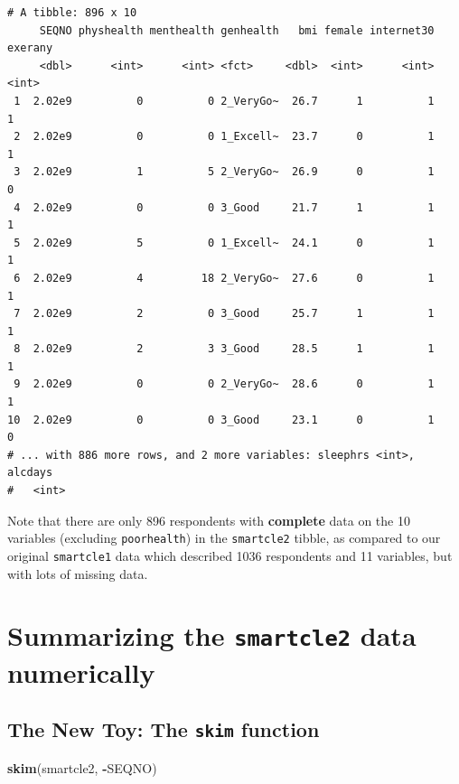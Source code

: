 \documentclass[]{book}
\newenvironment{Shaded}{\begin{snugshade}}{\end{snugshade}}
\newcommand{\KeywordTok}[1]{\textcolor[rgb]{0.13,0.29,0.53}{\textbf{#1}}}
\newcommand{\OperatorTok}[1]{\textcolor[rgb]{0.81,0.36,0.00}{\textbf{#1}}}
\newcommand{\NormalTok}[1]{#1}
\theoremstyle{definition}
\theoremstyle{definition}
\theoremstyle{definition}
\theoremstyle{remark}
\begin{document}
\begin{verbatim}
# A tibble: 896 x 10
     SEQNO physhealth menthealth genhealth   bmi female internet30 exerany
     <dbl>      <int>      <int> <fct>     <dbl>  <int>      <int>   <int>
 1  2.02e9          0          0 2_VeryGo~  26.7      1          1       1
 2  2.02e9          0          0 1_Excell~  23.7      0          1       1
 3  2.02e9          1          5 2_VeryGo~  26.9      0          1       0
 4  2.02e9          0          0 3_Good     21.7      1          1       1
 5  2.02e9          5          0 1_Excell~  24.1      0          1       1
 6  2.02e9          4         18 2_VeryGo~  27.6      0          1       1
 7  2.02e9          2          0 3_Good     25.7      1          1       1
 8  2.02e9          2          3 3_Good     28.5      1          1       1
 9  2.02e9          0          0 2_VeryGo~  28.6      0          1       1
10  2.02e9          0          0 3_Good     23.1      0          1       0
# ... with 886 more rows, and 2 more variables: sleephrs <int>, alcdays
#   <int>
\end{verbatim}

Note that there are only 896 respondents with \textbf{complete} data on
the 10 variables (excluding \texttt{poorhealth}) in the
\texttt{smartcle2} tibble, as compared to our original
\texttt{smartcle1} data which described 1036 respondents and 11
variables, but with lots of missing data.

\section{\texorpdfstring{Summarizing the \texttt{smartcle2} data
numerically}{Summarizing the smartcle2 data numerically}}\label{summarizing-the-smartcle2-data-numerically}

\subsection{\texorpdfstring{The New Toy: The \texttt{skim}
function}{The New Toy: The skim function}}\label{the-new-toy-the-skim-function}

\begin{Shaded}
\begin{Highlighting}[]
\KeywordTok{skim}\NormalTok{(smartcle2, }\OperatorTok{-}\NormalTok{SEQNO)}
\end{Highlighting}
\end{Shaded}
\end{document}
